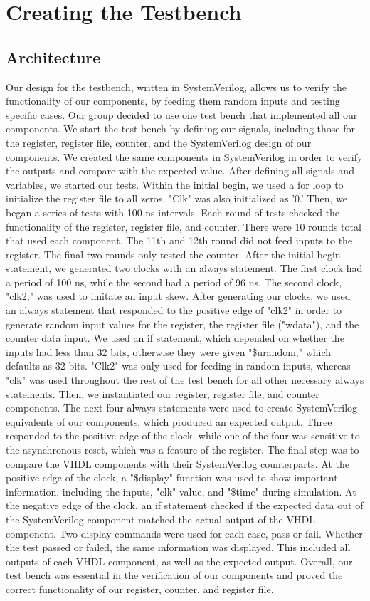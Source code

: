 \documentclass[paper=letter, fontsize=11pt]{scrartcl}
\numberwithin{equation}{section} %
\numberwithin{figure}{section} %
\numberwithin{table}{section} %
\begin{document}
\section{Creating the Testbench}

\subsection{Architecture}
\begin{flushleft}
	Our design for the testbench, written in SystemVerilog, allows us to verify the functionality of our components, by feeding them random inputs and testing specific cases. Our group decided to use one test bench that implemented all our components. We start the test bench by defining our signals, including those for the register, register file, counter, and the SystemVerilog design of our components. We created the same components in SystemVerilog in order to verify the outputs and compare with the expected value. After defining all signals and variables, we started our tests. Within the initial begin, we used a for loop to initialize the register file to all zeros. "Clk" was also initialized as '0.' Then, we began a series of tests with 100 ns intervals. Each round of tests checked the functionality of the register, register file, and counter. There were 10 rounds total that used each component. The 11th and 12th round did not feed inputs to the register. The final two rounds only tested the counter. After the initial begin statement, we generated two clocks with an always statement. The first clock had a period of 100 ns, while the second had a period of 96 ns. The second clock, "clk2," was used to imitate an input skew. After generating our clocks, we used an always statement that responded to the positive edge of "clk2" in order to generate random input values for the register, the register file ("wdata"), and the counter data input. We used an if statement, which depended on whether the inputs had less than 32 bits, otherwise they were given "\$urandom," which defaults as 32 bits. "Clk2" was only used for feeding in random inputs, whereas "clk" was used throughout the rest of the test bench for all other necessary always statements. Then, we instantiated our register, register file, and counter components. The next four always statements were used to create SystemVerilog equivalents of our components, which produced an expected output. Three responded to the positive edge of the clock, while one of the four was sensitive to the asynchronous reset, which was a feature of the register. The final step was to compare the VHDL components with their SystemVerilog counterparts. At the positive edge of the clock, a "\$display" function was used to show important information, including the inputs, "clk" value, and "\$time" during simulation. At the negative edge of the clock, an if statement checked if the expected data out of the SystemVerilog component matched the actual output of the VHDL component. Two display commands were used for each case, pass or fail. Whether the test passed or failed, the same information was displayed. This included all outputs of each VHDL component, as well as the expected output. Overall, our test bench was essential in the verification of our components and proved the correct functionality of our register, counter, and register file.               
	         
\end{flushleft}
\end{document}
